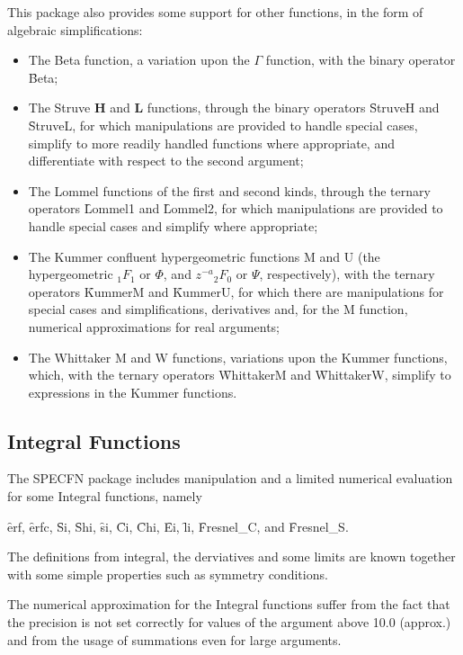 This package also provides some support for other functions, in the form
of algebraic simplifications:
\begin{itemize}
\item The Beta function, a variation upon the $\Gamma$
function\cite{Abramowitz:72}, with the binary operator \f{Beta};
\item The Struve \textbf{H} and \textbf{L} functions, through the binary
operators \f{StruveH} and \f{StruveL}, for which manipulations are
provided to handle special cases, simplify to more readily handled
functions where appropriate, and differentiate with respect to the second
argument;
\item The Lommel functions of the first and second kinds, through the
ternary operators \f{Lommel1} and \f{Lommel2}, for which manipulations
are provided to handle special cases and simplify where appropriate;
\item The Kummer confluent hypergeometric functions M and U (the
hypergeometric ${_1F_1}$ or $\Phi$, and $z^{-a}{_2F_0}$ or $\Psi$,
respectively),
with the ternary operators \f{KummerM} and \f{KummerU}, for which
there are manipulations for special cases and simplifications, derivatives
and, for the M function, numerical approximations for real arguments;
\item The Whittaker M and W functions, variations upon the Kummer
functions, which, with the ternary operators \f{WhittakerM} and 
\f{WhittakerW}, simplify to expressions in the Kummer functions.
\end{itemize}

\subsection{Integral Functions}

The SPECFN package includes manipulation and a limited numerical
evaluation for some Integral functions, namely

\f{erf}, \f{erfc}, \f{Si}, \f{Shi}, \f{si}, \f{Ci}, \f{Chi}, \f{Ei}, \f{li},  
\f{Fresnel\_C}, and \f{Fresnel\_S}.

The definitions from integral, the derviatives and some limits are
known together with some simple properties such as symmetry
conditions.

The numerical approximation for the Integral functions suffer
from the fact that the precision is not set correctly for
values of the argument above 10.0 (approx.) and from the
usage of summations even for large arguments.

